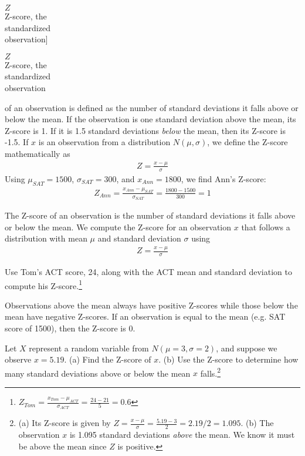 $Z$\vspace{1mm}\\\footnotesize Z-score, the\\standardized\\observation]{\raggedright\vspace{-3mm}

$Z$\vspace{1mm}\\\footnotesize Z-score, the\\standardized\\observation} of an observation is defined as the number of standard deviations it falls above or below the mean. If the observation is one standard deviation above the mean, its Z-score is 1. If it is 1.5 standard deviations \emph{below} the mean, then its Z-score is -1.5. If $x$ is an observation from a distribution $N(\mu, \sigma)$, we define the Z-score mathematically as
\begin{eqnarray*}
Z = \frac{x-\mu}{\sigma}
\end{eqnarray*}
Using $\mu_{SAT}=1500$, $\sigma_{SAT}=300$, and $x_{Ann}=1800$, we find Ann's Z-score:
\begin{eqnarray*}
Z_{Ann} = \frac{x_{Ann} - \mu_{SAT}}{\sigma_{SAT}} = \frac{1800-1500}{300} = 1
\end{eqnarray*}

\begin{termBox}{
The Z-score of an observation is the number of standard deviations it falls above or below the mean. We compute the Z-score for an observation $x$ that follows a distribution with mean $\mu$ and standard deviation $\sigma$ using
\begin{eqnarray*}
Z = \frac{x-\mu}{\sigma}
\end{eqnarray*}}
\end{termBox}

\begin{exercise}
Use Tom's ACT score, 24, along with the ACT mean and standard deviation to compute his Z-score.\footnote{$Z_{Tom} = \frac{x_{Tom} - \mu_{ACT}}{\sigma_{ACT}} = \frac{24 - 21}{5} = 0.6$}
\end{exercise}

Observations above the mean always have positive Z-scores while those below the mean have negative Z-scores. If an observation is equal to the mean (e.g. SAT score of 1500), then the Z-score is $0$.

\begin{exercise}
Let $X$ represent a random variable from $N(\mu=3, \sigma=2)$, and suppose we observe $x=5.19$. (a) Find the Z-score of $x$. (b) Use the Z-score to determine how many standard deviations above or below the mean $x$ falls.\footnote{(a) Its Z-score is given by $Z = \frac{x-\mu}{\sigma} = \frac{5.19 - 3}{2} = 2.19/2 = 1.095$. (b) The observation $x$ is 1.095 standard deviations \emph{above} the mean. We know it must be above the mean since $Z$ is positive.}
\end{exercise}

